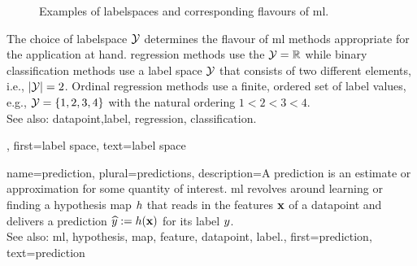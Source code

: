 {{\begin{figure}[H]
\begin{tikzpicture}[>=Stealth, font=\small]
		\end{tikzpicture}
		\caption{\label{fig_label_spaces_dict}	Examples of \glspl{labelspace} and corresponding flavours of 
		\gls{ml}.}
		\end{figure}
		The choice of \gls{labelspace} $\labelspace$ determines the flavour of \gls{ml} methods 
		appropriate for the application at hand. \Gls{regression} methods use the $\labelspace = \mathbb{R}$ while binary \gls{classification} methods 
		use a \gls{label} space $\labelspace$ that consists of two different 
		elements, i.e., $|\labelspace|=2$. Ordinal \gls{regression} methods use a finite, ordered set of 
		\gls{label} values, e.g., $\labelspace = \{1,2,3,4\}$ with the natural ordering $1 < 2 < 3 < 4$. 
					\\ 
		See also:  \gls{datapoint},\gls{label}, \gls{regression}, \gls{classification}.}, 
	first={label space},
	text={label space}  
}

{name={prediction}, plural={predictions},
	description={A prediction is an estimate or approximation for some 
		quantity of interest. \Gls{ml} revolves around learning or finding a \gls{hypothesis} \gls{map} $\hypothesis$ 
		that reads in the \glspl{feature} $\featurevec$ of a \gls{datapoint} and delivers a prediction 
		$\widehat{\truelabel} \defeq \hypothesis(\featurevec)$ for its \gls{label} $\truelabel$.
					\\ 
		See also: \gls{ml}, \gls{hypothesis}, \gls{map}, \gls{feature}, \gls{datapoint}, \gls{label}.},
	first={prediction},
	text={prediction}  
}


